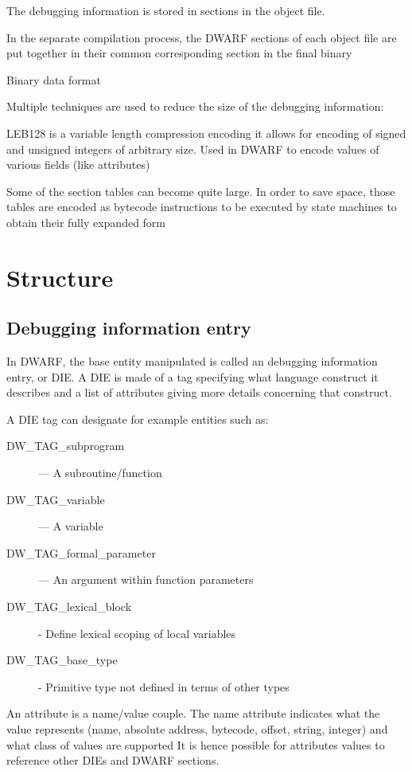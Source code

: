 The debugging information is stored in sections in the object file.

In the separate compilation process, the DWARF sections of each object file are
put together in their common corresponding section in the final binary

Binary data format

Multiple techniques are used to reduce the size of the debugging information:

LEB128 is a variable length compression encoding
it allows for encoding of signed and unsigned integers of arbitrary size.
Used in DWARF to encode values of various fields (like attributes)

Some of the section tables can become quite large.
In order to save space, those tables are encoded as bytecode instructions to be executed by state machines to obtain their fully expanded form

\section{Structure}

\subsection{Debugging information entry}

In DWARF, the base entity manipulated is called an debugging information entry, or DIE.
A DIE is made of a tag specifying what language construct it describes and a list of attributes giving more details concerning that construct.

A DIE tag can designate for example entities such as:
\begin{description}
    \item[DW\_TAG\_subprogram] — A subroutine/function
    \item[DW\_TAG\_variable] — A variable
    \item[DW\_TAG\_formal\_parameter] — An argument within function parameters
    \item[DW\_TAG\_lexical\_block] - Define lexical scoping of local variables
    \item[DW\_TAG\_base\_type] - Primitive type not defined in terms of other
        types
\end{description}

An attribute is a name/value couple.
The name attribute indicates what the value represents (name, absolute address,
bytecode, offset, string, integer) and what class of values are supported
It is hence possible for attributes values to reference other DIEs and DWARF sections.


